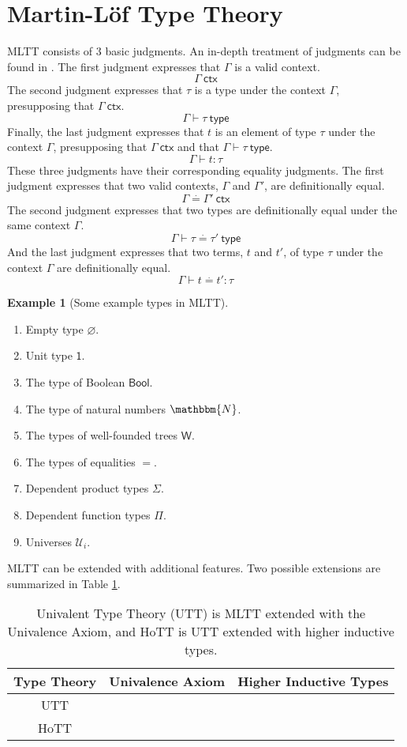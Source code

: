 \documentclass{amsart}
\newcommand{\cmark}{\ding{51}}%
\newcommand{\xmark}{\ding{55}}
\theoremstyle{definition}
\newtheorem{eg}{Example}[section]
\newcommand{\N}{\mathbbm{N}}
\newcommand{\ctx}{\ensuremath{\mathsf{~ctx}}}
\newcommand{\type}{\ensuremath{\mathsf{~type}}}
\newcommand{\defeq}{\ensuremath{\overset{\cdot}{=}}}
\newcommand{\Unit}{\ensuremath{\mathsf{1}}}
\newcommand{\Bool}{\ensuremath{\mathsf{Bool}}}
\newcommand{\W}{\ensuremath{\mathsf{W}}}
\newcommand{\U}{\ensuremath{\mathcal{U}}}
\begin{document}
\section{Martin-L\"{o}f Type Theory}
\label{sec:martin-lof-type-theory}
MLTT consists of 3 basic judgments.
An in-depth treatment of judgments can be found in \cite{ml:justif-log}.
The first judgment expresses that $\Gamma$ is a valid context.
\[
\Gamma \ctx
\]
The second judgment expresses that $\tau$ is a type under the context $\Gamma$, presupposing that $\Gamma \ctx$.
\[
\Gamma \vdash \tau \type
\]
Finally, the last judgment expresses that $t$ is an element of type $\tau$ under the context $\Gamma$, presupposing that $\Gamma \ctx$ and that $\Gamma \vdash \tau \type$.
\[
\Gamma \vdash t : \tau
\]
These three judgments have their corresponding equality judgments.
The first judgment expresses that two valid contexts, $\Gamma$ and $\Gamma'$, are definitionally equal.
\[
\Gamma \defeq \Gamma' \ctx
\]
The second judgment expresses that two types are definitionally equal under the same context $\Gamma$.
\[
\Gamma \vdash \tau \defeq \tau' \type
\]
And the last judgment expresses that two terms, $t$ and $t'$, of type $\tau$ under the context $\Gamma$ are definitionally equal.
\[
\Gamma \vdash t \defeq t' : \tau
\]
\begin{eg}[Some example types in MLTT]
\hfill
\begin{multicols}{2}
\begin{enumerate}
\item Empty type $\varnothing$.
\item Unit type $\Unit$.
\item The type of Boolean $\Bool$.
\item The type of natural numbers $\N$.
\item The types of well-founded trees $\W$.
\item The types of equalities $=$.
\item Dependent product types $\Sigma$.
\item Dependent function types $\Pi$.
\item Universes $\U_{i}$.
\end{enumerate}
\end{multicols}
\end{eg}

MLTT can be extended with additional features.
Two possible extensions are summarized in Table \ref{tb:extensions-of-mltt}.
\begin{table}[h]
    \centering
    \begin{tabular}{|c||c|c|}\hline
        Type Theory & Univalence Axiom & Higher Inductive Types\\\hline
        UTT  & \cmark & \xmark\\\hline
        HoTT & \cmark & \cmark\\\hline
    \end{tabular}
    \caption{Univalent Type Theory (UTT) is MLTT extended with the Univalence Axiom, and HoTT is UTT extended with higher inductive types.}
    \label{tb:extensions-of-mltt}
\end{table}
\end{document}
